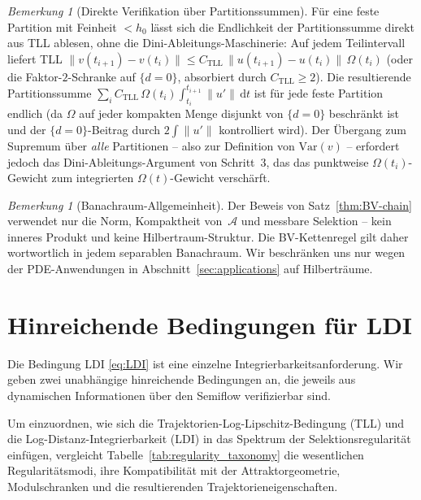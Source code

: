 \documentclass[12pt,a4paper]{article}
\theoremstyle{definition}
\theoremstyle{plain}
\theoremstyle{remark}
\newtheorem{remark}[definition]{Bemerkung}
\newcommand{\Var}{\mathrm{Var}}
\begin{document}
\begin{remark}[Direkte Verifikation über Partitionssummen]
\label{rem:partition-sum}
Für eine feste Partition mit Feinheit $< h_0$ lässt sich die
Endlichkeit der Partitionssumme direkt aus TLL ablesen, ohne die
Dini-Ableitungs-Maschinerie: Auf jedem Teilintervall liefert TLL
$\|v(t_{i+1}) - v(t_i)\|
\le C_{\mathrm{TLL}}\,\|u(t_{i+1}) - u(t_i)\|\,\Omega(t_i)$
(oder die Faktor-$2$-Schranke auf $\{d = 0\}$, absorbiert durch
$C_{\mathrm{TLL}} \ge 2$).  Die resultierende Partitionssumme
$\sum_i C_{\mathrm{TLL}}\,\Omega(t_i)\int_{t_i}^{t_{i+1}}
\|u'\|\,\mathrm{d}t$ ist für jede feste Partition endlich
(da $\Omega$ auf jeder kompakten Menge disjunkt von $\{d=0\}$
beschränkt ist und der $\{d=0\}$-Beitrag durch $2\int\|u'\|$
kontrolliert wird).  Der Übergang zum Supremum über \emph{alle}
Partitionen -- also zur Definition von
$\Var(v)$ -- erfordert jedoch das Dini-Ableitungs-Argument
von Schritt~3, das das punktweise $\Omega(t_i)$-Gewicht
zum integrierten $\Omega(t)$-Gewicht verschärft.
\end{remark}

\begin{remark}[Banachraum-Allgemeinheit]
\label{rem:banach}
Der Beweis von Satz~\ref{thm:BV-chain} verwendet nur die Norm,
Kompaktheit von~$\mathcal{A}$ und messbare Selektion -- kein
inneres Produkt und keine Hilbertraum-Struktur.  Die
BV-Kettenregel gilt daher wortwortlich in jedem separablen
Banachraum.  Wir beschränken uns nur wegen der PDE-Anwendungen
in Abschnitt~\ref{sec:applications} auf Hilberträume.
\end{remark}


\section{Hinreichende Bedingungen für LDI}
\label{sec:sufficient}

Die Bedingung LDI \eqref{eq:LDI} ist eine einzelne
Integrierbarkeitsanforderung.  Wir geben zwei unabhängige
hinreichende Bedingungen an, die jeweils aus dynamischen
Informationen über den Semiflow verifizierbar sind.

Um einzuordnen, wie sich die Trajektorien-Log-Lipschitz-Bedingung (TLL) und die Log-Distanz-Integrierbarkeit (LDI) in das Spektrum der Selektionsregularität einfügen, vergleicht Tabelle~\ref{tab:regularity_taxonomy} die wesentlichen Regularitätsmodi, ihre Kompatibilität mit der Attraktorgeometrie, Modulschranken und die resultierenden Trajektorieneigenschaften.
\end{document}
